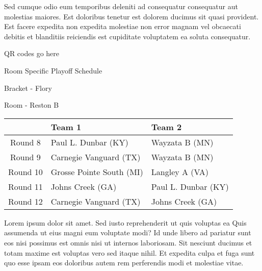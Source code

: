 \documentclass{article}%
\begin{document}
\newline%
Sed cumque odio eum temporibus deleniti ad consequatur consequatur aut molestias maiores. Est doloribus tenetur est dolorem ducimus sit quasi provident. Est facere expedita non expedita molestiae non error magnam vel obcaecati debitis et blanditiis reiciendis est cupiditate voluptatem ea soluta consequatur.%
\vspace*{140pt}%
\begin{center}%
\begin{Huge}%
QR codes go here%
\end{Huge}%
\end{center}%
\newpage%
\begin{center}%
\begin{Huge}%
Room Specific Playoff Schedule%
\end{Huge}%
\vspace*{8pt}%
\linebreak%
\begin{Large}%
Bracket {-} Flory%
\end{Large}%
\vspace*{8pt}%
\linebreak%
\vspace*{8pt}%
\begin{Large}%
Room {-} Reston B%
\end{Large}%
\end{center}%
%
\begin{tabularx}{\textwidth}{|c|Y|Y|}%
\hline%
&Team 1&Team 2\\%
\hline%
Round 8&Paul L. Dunbar (KY)&Wayzata B (MN)\\%
Round 9&Carnegie Vanguard (TX)&Wayzata B (MN)\\%
Round 10&Grosse Pointe South (MI)&Langley A (VA)\\%
Round 11&Johns Creek (GA)&Paul L. Dunbar (KY)\\%
Round 12&Carnegie Vanguard (TX)&Johns Creek (GA)\\%
\hline%
\end{tabularx}%
\vspace*{8pt}%
\newline%
Lorem ipsum dolor sit amet. Sed iusto reprehenderit ut quis voluptas ea Quis assumenda ut eius magni eum voluptate modi? Id unde libero ad pariatur sunt eos nisi possimus est omnis nisi ut internos laboriosam. Sit nesciunt ducimus et totam maxime est voluptas vero sed itaque nihil. Et expedita culpa et fuga sunt quo esse ipsam eos doloribus autem rem perferendis modi et molestiae vitae.\newline%
\end{document}
